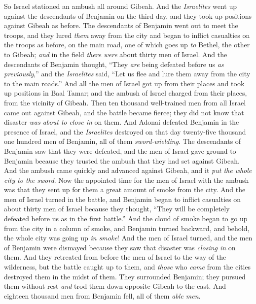 \begin{biblechapter}
\verse So Israel stationed an ambush all around Gibeah.
\verse And the \textit{Israelites} went up against the descendants of Benjamin on the third day, and they took up positions against Gibeah as before.
\verse The descendants of Benjamin went out to meet the troops, and they lured \textit{them} away from the city and began to inflict casualties on the troops as before, on the main road, one of which goes up \textit{to} Bethel, the other to Gibeah; \textit{and} in the field \textit{there were} about thirty men of Israel.
\verse And the descendants of Benjamin thought, “They \textit{are} being defeated before us \textit{as previously},” and the \textit{Israelites} said, “Let us flee and lure them away from the city to the main roads.”
\verse And all the men of Israel got up from their places and took up positions in Baal Tamar; and the ambush of Israel charged from their places, from the vicinity of Gibeah.
\verse Then ten thousand well-trained men from all Israel came out against Gibeah, and the battle became fierce; they did not know that disaster \textit{was about to} \textit{close in} on them.
\verse And Adonai defeated Benjamin in the presence of Israel, and the \textit{Israelites} destroyed on that day twenty-five thousand one hundred men of Benjamin, all of them \textit{sword-wielding}.
\verse The descendants of Benjamin saw that they were defeated, and the men of Israel gave ground to Benjamin because they trusted the ambush that they had set against Gibeah.
\verse And the ambush came quickly and advanced against Gibeah, and it \textit{put the whole city to the sword}.
\verse Now the appointed time for the men of Israel with the ambush was that they sent up for them a great amount of smoke from the city.
\verse And the men of Israel turned in the battle, and Benjamin began to inflict casualties on about thirty men of Israel because they thought, “They will be completely defeated before us as in the first battle.”
\verse And the cloud of smoke began to go up from the city in a column of smoke, and Benjamin turned backward, and behold, the whole city was going up \textit{in smoke}!
\verse And the men of Israel turned, and the men of Benjamin were dismayed because they saw that disaster was \textit{closing in} on them.
\verse And they retreated from before the men of Israel to the way of the wilderness, but the battle caught up to them, and \textit{those} who \textit{came} from the cities destroyed them in the midst of them.
\verse They surrounded Benjamin; they pursued them without rest \textit{and} trod them down opposite Gibeah to the east.
\verse And eighteen thousand men from Benjamin fell, all of them \textit{able men}.

\end{biblechapter}
